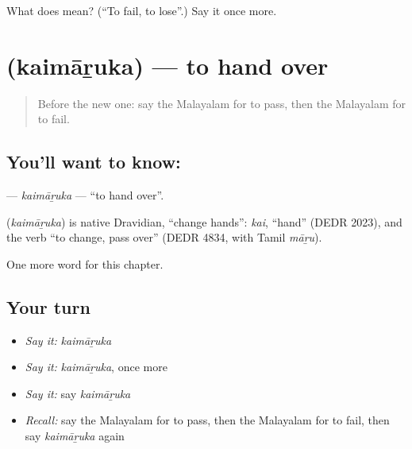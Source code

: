 \begin{tcolorbox}[breakable,colback=teal!4,colframe=teal!35!black,title={Before you move on}]
What does  mean? (\textquotedblleft{}To fail, to lose\textquotedblright{}.) Say it once more.
\end{tcolorbox}
\section[\texorpdfstring{\ml{കൈമാറുക} (kaimāṟuka)}{കൈമാറുക (kaimāṟuka)}]{ (kaimāṟuka) — to hand over}

\label{lesson:ML-C267-kaimaruka}



\begin{quote}
Before the new one: say the Malayalam for to pass, then the Malayalam for to fail.
\end{quote}

\subsection*{You'll want to know: }
\textbf{} — \emph{kaimāṟuka} — \textquotedblleft{}to hand over\textquotedblright{}.

\begin{cousinweb}
\textbf{} (\emph{kaimāṟuka}) is native Dravidian, \textquotedblleft{}change hands\textquotedblright{}: \emph{kai}, \textquotedblleft{}hand\textquotedblright{} (DEDR 2023), and the verb \textquotedblleft{}to change, pass over\textquotedblright{} (DEDR 4834, with Tamil \emph{māṟu}).
\end{cousinweb}

\begin{grammarlens}[title={What you've built}]
One more word for this chapter.
\end{grammarlens}

\subsection*{Your turn}
\begin{itemize}
\raggedright
  \item \emph{Say it:} \emph{kaimāṟuka}
  \item \emph{Say it:} \emph{kaimāṟuka}, once more
  \item \emph{Say it:} say \emph{kaimāṟuka}
  \item \emph{Recall:} say the Malayalam for to pass, then the Malayalam for to fail, then say \emph{kaimāṟuka} again
\end{itemize}

